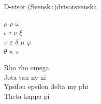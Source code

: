 \begin{song}{D-visor (Svenska)}{dvisorsvenska}
\setlength{\columnsep}{-2.5cm}
\begin{multicols}{2}
\begin{vers}
$\rho$ $\rho$ $\omega$\\ %
$\iota$ $\tau$ $\nu$ $\xi$\\
$\upsilon$ $\varepsilon$ $\delta$ $\mu$ $\varphi$\\
$\theta$ $\kappa$ $\pi$\\
\end{vers}
\columnbreak
\begin{vers}
Rho rho omega\\
Jota tau ny xi\\
Ypsilon epsilon delta my phi\\
Theta kappa pi\\
\end{vers}
\end{multicols}
\end{song}